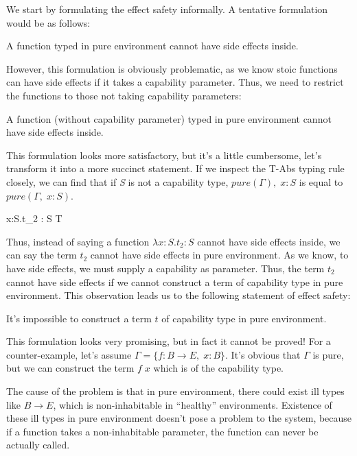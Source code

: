 We start by formulating the effect safety informally. A tentative
formulation would be as follows:

\begin{definition}
A function typed in pure environment cannot have side effects inside.
\end{definition}

However, this formulation is obviously problematic, as we know stoic
functions can have side effects if it takes a capability
parameter. Thus, we need to restrict the functions to those not taking
capability parameters:

\begin{definition}
  A function (without capability parameter) typed in pure environment
  cannot have side effects inside.
\end{definition}

This formulation looks more satisfactory, but it's a little
cumbersome, let's transform it into a more succinct statement. If we
inspect the T-Abs typing rule closely, we can find that if \emph{S} is
not a capability type, $pure(\Gamma),\; x: S$ is equal to
$pure(\Gamma,\; x: S)$.

{ \Gamma \vdash \lambda x:S.\;t_2 : S \to T }

Thus, instead of saying a function $\lambda x:S.t_2 : S$ cannot have
side effects inside, we can say the term $t_2$ cannot have side
effects in pure environment. As we know, to have side effects, we must
supply a capability as parameter. Thus, the term $t_2$ cannot have
side effects if we cannot construct a term of capability type in pure
environment. This observation leads us to the following statement of
effect safety:

\begin{definition}
 It's impossible to construct a term $t$ of capability type in pure environment.
\end{definition}

This formulation looks very promising, but in fact it cannot be proved!
For a counter-example, let's assume $\Gamma = \{f: B \to E, \; x:
B\}$. It's obvious that $\Gamma$ is pure, but we can construct the
term $f \; x$ which is of the capability type.

The cause of the problem is that in pure environment, there could exist
ill types like $B \to E$, which is non-inhabitable in ``healthy''
environments.  Existence of these ill types in pure environment
doesn't pose a problem to the system, because if a function takes a
non-inhabitable parameter, the function can never be actually called.

